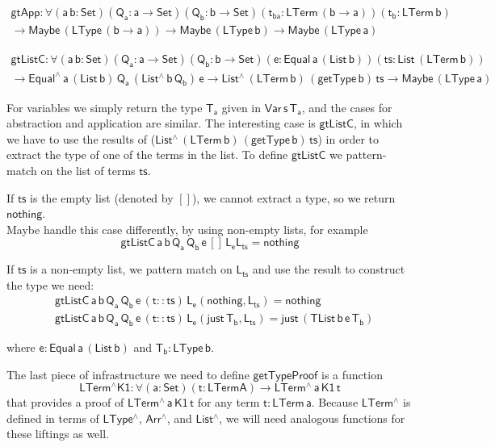 \documentclass[acmsmall,screen,review,anonymous]{acmart}
\theoremstyle{definition}
\begin{document}
\begin{multline*}
    \mathsf{gtApp : \forall (a \, b : Set) (Q_a : a \to Set) (Q_b : b \to Set) 
      (t_{ba} : LTerm\, (b \to a)) (t_b : LTerm\, b)} \\ 
    \mathsf{
      \to Maybe\, (LType\, (b \to a))
      \to Maybe\, (LType\, b)
      \to Maybe\, (LType\, a)
    }
\end{multline*}


\begin{multline*}
    \mathsf{gtListC : \forall (a \, b : Set) (Q_a : a \to Set) (Q_b : b \to Set) 
      (e : Equal\, a\, (List\, b)) (ts : List\, (LTerm\, b))} \\ 
    \mathsf{
      \to Equal^{\wedge}\, a\, (List\,b) \, Q_a\, (List^{\wedge}\, b\, Q_b)\, e
      \to List^{\wedge}\, (LTerm\, b)\, (getType\, b)\, ts
      \to Maybe\, (LType\, a)
    }
\end{multline*}


For variables we simply return the type $\mathsf{T_a}$ given in $\mathsf{Var\, s\, T_a}$, 
and the cases for abstraction and application are similar.
The interesting case is $\mathsf{gtListC}$, in which we have to use 
the results of ($\mathsf{List^{\wedge}\, (LTerm\, b)\, (getType\, b)\, ts}$)
in order to extract the type of one of the terms in the list. 
To define $\mathsf{gtListC}$ we pattern-match on the list of terms $\mathsf{ts}$.  

If $\mathsf{ts}$ is the empty list (denoted by $\mathsf{[]}$), we cannot extract a type, 
so we return $\mathsf{nothing}$. \\
{\color{red} Maybe handle this case differently, by using non-empty lists, for example}
\[
  \mathsf{gtListC\, a\, b\, Q_a\, Q_b\, e\, [] \, L_e L_{ts} = nothing}
\]

If $\mathsf{ts}$ is a non-empty list, we pattern match on $\mathsf{L_{ts}}$ and use the result
to construct the type we need:
\begin{align*}
  &\mathsf{gtListC\, a\, b\, Q_a\, Q_b\, e\, (t :: ts) \, L_e (nothing , L_{ts}) = nothing} \\
  &\mathsf{gtListC\, a\, b\, Q_a\, Q_b\, e\, (t :: ts) \, L_e (just\, T_b , L_{ts}) = just \, (TList\, b\, e\, T_b)}
\end{align*}

where $\mathsf{e : Equal\, a\, (List\,b)}$ and $\mathsf{T_b : LType\, b}$. 

The last piece of infrastructure we need to define $\mathsf{getTypeProof}$ is a function 
\[
  \mathsf{LTerm^{\wedge}K1 : \forall (a : Set) (t : LTerm A) \to LTerm^{\wedge}\, a\, K1\,t}
\]
that provides a 
proof of $\mathsf{LTerm^{\wedge}\,a\,K1\,t}$ for any term $\mathsf{t : LTerm\, a}$. 
Because $\mathsf{LTerm^{\wedge}}$ is defined in terms of $\mathsf{LType^{\wedge}}$, $\mathsf{Arr^{\wedge}}$, 
and $\mathsf{List^{\wedge}}$, we will need analogous functions for these liftings as well. 
\end{document}

